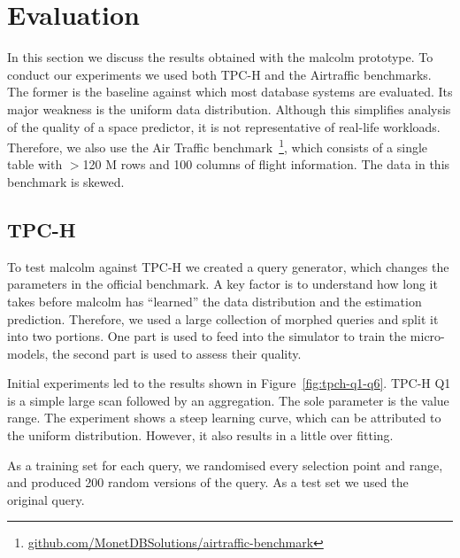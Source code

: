\documentclass[conference]{IEEEtran}
\begin{document}
\section{Evaluation}
\label{sec:evaluation}
In this section we discuss the results obtained with the {\sc malcolm} prototype.
To conduct our experiments we used both TPC-H and the Airtraffic benchmarks.
The former is the baseline against which most database systems are evaluated.
Its major weakness is the uniform data distribution.
Although this simplifies analysis of the quality of a space predictor, it is not representative of real-life workloads.
Therefore, we also use the Air Traffic benchmark~\footnote{\url{github.com/MonetDBSolutions/airtraffic-benchmark}}, which consists of a single table with $>$120 M rows and 100 columns of flight information.
The data in this benchmark is skewed.

\subsection{TPC-H}
To test {\sc malcolm} against TPC-H we created a query generator, which changes the parameters in the official benchmark.
A key factor is to understand how long it takes before {\sc malcolm} has ``learned'' the data distribution and the estimation prediction.
Therefore, we used a large collection of morphed queries and split it into two portions.
One part is used to feed into the simulator to train the micro-models, the second part is used to assess their quality.

Initial experiments led to the results shown in Figure~\ref{fig:tpch-q1-q6}.
TPC-H Q1 is a simple large scan followed by an aggregation. The sole parameter is the value range.
The experiment shows a steep learning curve, which can be attributed to the uniform distribution.
However, it also results in a little over fitting.

As a training set for each query, we randomised every selection point and range, and produced 200 random versions of the query.
As a test set we used the original query.
\end{document}
